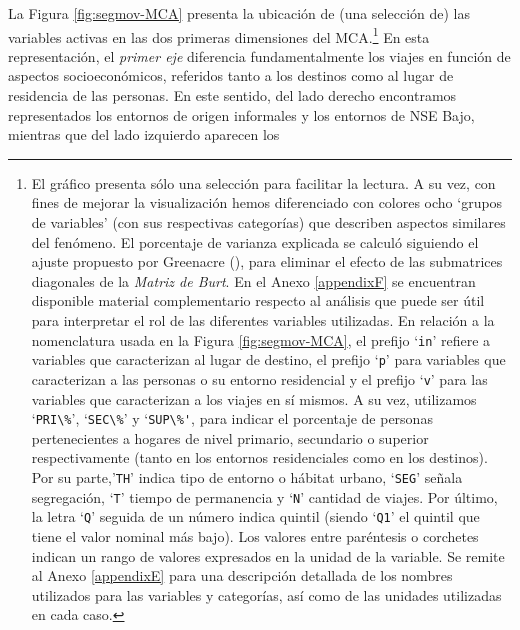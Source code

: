 \documentclass[
  spanish,
  a4paper,%
  chapterprefix=true,%
  DIV=calc,%
  twoside]{scrbook}%
\newcommand{\passthrough}[1]{#1}
\begin{document}
La Figura \ref{fig:segmov-MCA} presenta la ubicación de (una selección
de) las variables activas en las dos primeras dimensiones del
MCA.\footnote{El gráfico presenta sólo una selección
  para facilitar la lectura. A su vez, con fines de mejorar la
  visualización hemos diferenciado con colores ocho `grupos de
  variables' (con sus respectivas categorías) que describen aspectos
  similares del fenómeno. El porcentaje de varianza explicada se
  calculó siguiendo el ajuste propuesto por Greenacre (), para
  eliminar el efecto de las submatrices diagonales de la \emph{Matriz de
  Burt}. En el Anexo \ref{appendixF} se encuentran disponible
  material complementario respecto al análisis que puede ser útil para
  interpretar el rol de las diferentes variables utilizadas. En
  relación a la nomenclatura usada en la Figura \ref{fig:segmov-MCA},
  el prefijo `\passthrough{\lstinline!in!}' refiere a variables que caracterizan al lugar de
  destino, el prefijo `\passthrough{\lstinline!p!}' para variables que caracterizan a las
  personas o su entorno residencial y el prefijo `\passthrough{\lstinline!v!}' para las
  variables que caracterizan a los viajes en sí mismos. A su vez,
  utilizamos `\passthrough{\lstinline!PRI\%!}', `\passthrough{\lstinline!SEC\%!}' y `\passthrough{\lstinline!SUP\%'!}, para indicar el porcentaje
  de personas pertenecientes a hogares de nivel primario, secundario o
  superior respectivamente (tanto en los entornos residenciales como
  en los destinos). Por su parte,'\passthrough{\lstinline!TH!}' indica tipo de entorno o
  hábitat urbano, `\passthrough{\lstinline!SEG!}' señala segregación, `\passthrough{\lstinline!T!}' tiempo de
  permanencia y `\passthrough{\lstinline!N!}' cantidad de viajes. Por último, la letra `\passthrough{\lstinline!Q!}'
  seguida de un número indica quintil (siendo `\passthrough{\lstinline!Q1!}' el quintil que
  tiene el valor nominal más bajo). Los valores entre paréntesis o
  corchetes indican un rango de valores expresados en la unidad de la
  variable. Se remite al Anexo \ref{appendixE} para una descripción
  detallada de los nombres utilizados para las variables y categorías,
  así como de las unidades utilizadas en cada caso.} En esta representación, el \emph{primer
eje} diferencia fundamentalmente los viajes en función de aspectos
socioeconómicos, referidos tanto a los destinos como al lugar de
residencia de las personas. En este sentido, del lado derecho
encontramos representados los entornos de origen informales y los
entornos de NSE Bajo, mientras que del lado izquierdo aparecen los
\end{document}
